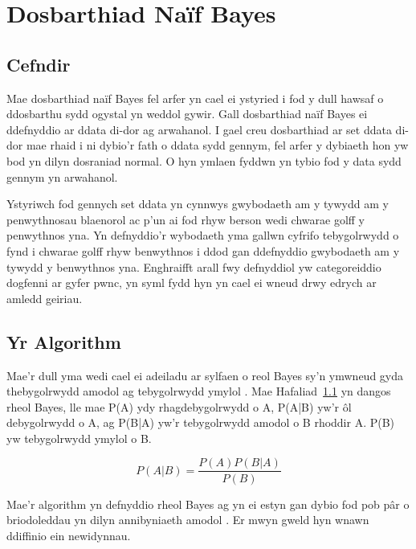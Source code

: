 \chapter{Dosbarthiad Na\"{i}f Bayes}\label{cha:Dosbarthiad_naif_bayes}
\section{Cefndir}

Mae dosbarthiad na\"{i}f Bayes fel arfer yn cael ei ystyried i fod y dull hawsaf o ddosbarthu sydd ogystal yn weddol gywir. Gall dosbarthiad na\"{i}f Bayes ei ddefnyddio ar ddata di-dor ag arwahanol. I gael creu dosbarthiad ar set ddata di-dor mae rhaid i ni dybio'r fath o ddata sydd gennym, fel arfer y dybiaeth hon yw bod yn dilyn dosraniad normal. O hyn ymlaen fyddwn yn tybio fod y data sydd gennym yn arwahanol. 

Ystyriwch fod gennych set ddata yn cynnwys gwybodaeth am y tywydd am y penwythnosau blaenorol ac p'un ai fod rhyw berson wedi chwarae golff y penwythnos yna. Yn defnyddio'r wybodaeth yma gallwn cyfrifo tebygolrwydd o fynd i chwarae golff rhyw benwythnos i ddod gan ddefnyddio gwybodaeth am y tywydd y benwythnos yna. Enghraifft arall fwy defnyddiol yw categoreiddio dogfenni ar gyfer pwnc, yn syml fydd hyn yn cael ei wneud drwy edrych ar amledd geiriau.\cite{amledd}

\section{Yr Algorithm}

Mae'r dull yma wedi cael ei adeiladu ar sylfaen o reol Bayes sy'n ymwneud gyda thebygolrwydd amodol ag tebygolrwydd ymylol \cite{naif-bayes}. Mae Hafaliad~\ref{eqn:Rheol-Bayes} yn dangos rheol Bayes, lle mae P(A) ydy rhagdebygolrwydd o A, P(A|B) yw'r \^{o}l debygolrwydd o A, ag P(B|A) yw'r tebygolrwydd amodol o B rhoddir A. P(B) yw tebygolrwydd ymylol o B. 

\begin{figure}[H]
\begin{equation}
P(A|B) = \frac{P(A)P(B|A)}{P(B)}
\end{equation}
\label{eqn:Rheol-Bayes}
\end{figure}


Mae'r algorithm yn defnyddio rheol Bayes ag yn ei estyn gan dybio fod pob p\^{a}r o briodoleddau yn dilyn annibyniaeth amodol \cite{scikit-learn-bayes}. Er mwyn gweld hyn wnawn ddiffinio ein newidynnau.

